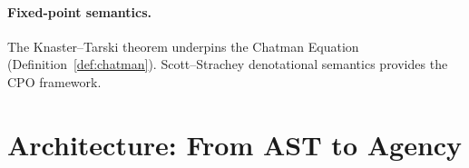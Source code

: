\documentclass[12pt,a4paper]{article}
\theoremstyle{definition}
\theoremstyle{remark}
\begin{document}
\paragraph{Fixed-point semantics.}
The Knaster--Tarski theorem \citep{tarski1955lattice} underpins the
Chatman Equation (Definition~\ref{def:chatman}).
Scott--Strachey denotational semantics \citep{strachey2000fundamental}
provides the CPO framework.

\section{Architecture: From AST to Agency}
\label{sec:architecture}
\end{document}

